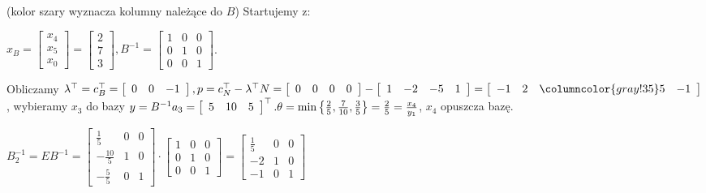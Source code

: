 \documentclass[licencjacka]{pracamgr}
\begin{document}
(kolor szary wyznacza kolumny należące do $B$)\newline
Startujemy z:\newline
\centerline{$x_B=\left[\begin{array}{c}x_4\\x_5\\x_0\end{array}\right]=\left[\begin{array}{c}2\\7\\3\end{array}\right],
B^{-1}=\left[\begin{array}{ccc}1&0&0\\0&1&0\\0&0&1\end{array}\right]$.}\newline
Obliczamy $\lambda^{\top}=c_B^{\top}=\left[\begin{array}{ccc}0&0&-1\end{array}\right],\newline
p=c_N^{\top}-\lambda^{\top}N=\left[\begin{array}{cccc}0&0&0&0\end{array}\right]-\left[\begin{array}{cccc}1&-2&-5&1\end{array}\right]
=\left[\begin{array}{cc>{\columncolor{gray!35}}cc}-1&2&5&-1\end{array}\right]$,\newline
wybieramy $x_3$ do bazy $y=B^{-1}a_3=\left[\begin{array}{ccc}5&10&5\end{array}\right]^{\top}.\newline
\theta=\min{\left\{\frac{2}{5},\frac{7}{10},\frac{3}{5}\right\}}=\frac{2}{5}=\frac{x_4}{y_1}$, $x_4$ opuszcza bazę.\newline
\centerline{$B_2^{-1}=EB^{-1}=\left[\begin{array}{ccc}\frac{1}{5}&0&0\\-\frac{10}{5}&1&0\\-\frac{5}{5}&0&1\end{array}\right]\cdot\left[\begin{array}{ccc}1&0&0\\0&1&0\\0&0&1\end{array}\right]=
\left[\begin{array}{ccc}\frac{1}{5}&0&0\\-2&1&0\\-1&0&1\end{array}\right]$}\newline
\end{document}
